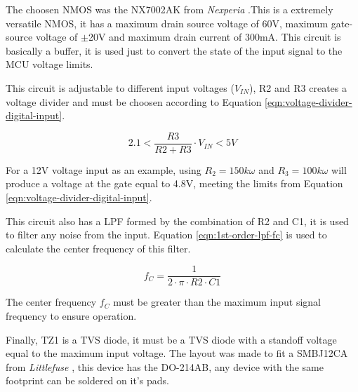 		The choosen NMOS was the NX7002AK from \textit{Nexperia} \cite{nx7002ak-datasheet}.This is a extremely versatile NMOS, it has a maximum drain source voltage of 60V, maximum gate-source voltage of $\pm$20V and maximum drain current of 300mA. This circuit is basically a buffer, it is used just to convert the state of the input signal to the MCU voltage limits. 

		This circuit is adjustable to different input voltages ($V_{IN}$), R2 and R3 creates a voltage divider and must be choosen according to Equation \ref{eqn:voltage-divider-digital-input}.

		\begin{equation}\label{eqn:voltage-divider-digital-input}
			2.1 < \frac{R3}{R2 + R3} \cdot V_{IN} < 5V
		\end{equation}

		For a 12V voltage input as an example, using $R_{2}=150k\omega$ and $R_{3}=100k\omega$ will produce a voltage at the gate equal to 4.8V, meeting the limits from Equation \ref{eqn:voltage-divider-digital-input}.

		This circuit also has a LPF formed by the combination of R2 and C1, it is used to filter any noise from the input. Equation \ref{eqn:1st-order-lpf-fc} is used to calculate the center frequency of this filter.

		\begin{equation}\label{eqn:1st-order-lpf-fc}
			f_{C} = \frac{1}{2 \cdot \pi \cdot R2 \cdot C1}
		\end{equation}

		The center frequency $f_{C}$ must be greater than the maximum input signal frequency to ensure operation.

		Finally, TZ1 is a TVS diode, it must be a TVS diode with a standoff voltage equal to the maximum input voltage. The layout was made to fit a SMBJ12CA from \textit{Littlefuse} \cite{smbj12a-datasheet}, this device has the DO-214AB, any device with the same footprint can be soldered on it's pads.
